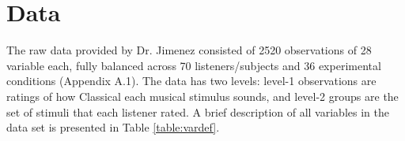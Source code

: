 \documentclass{article}
\begin{document}
\section{Data}






The raw data provided by Dr. Jimenez consisted of 2520 observations of 28 variable each, fully balanced across 70 listeners/subjects and 36 experimental conditions (Appendix A.1). The data has two levels: level-1 observations are ratings of how Classical each musical stimulus sounds, and level-2 groups are the set of stimuli that each listener rated. A brief description of all variables in the data set is presented in Table \ref{table:vardef}.

\bigbreak
\end{document}
